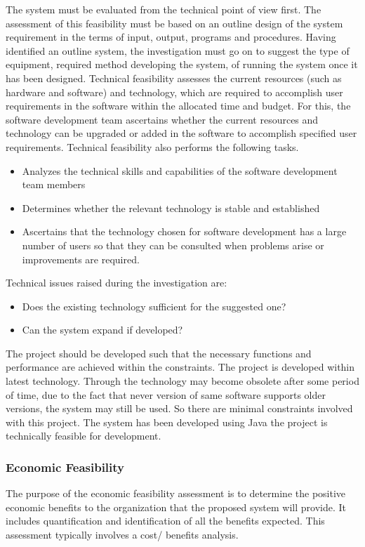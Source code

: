 The system must be evaluated from the technical point of view first. The assessment of this feasibility must be based on an outline design of the system requirement in the terms of input, output, programs and procedures. Having identified an outline system, the investigation must go on to suggest the type of equipment, required method developing the system, of running the system once it has been designed. Technical feasibility assesses the current resources (such as hardware and software) and technology, which are required to accomplish user requirements in the software within the allocated time and budget. For this, the software development team ascertains whether the current resources and technology can be upgraded or added in the software to accomplish specified user requirements. Technical feasibility also performs the following tasks.

\begin{itemize}
	\item Analyzes the technical skills and capabilities of the software development team members
	\item Determines whether the relevant technology is stable and established
	\item Ascertains that the technology chosen for software development has a large number of users so that they can be consulted when problems arise or improvements are required.
\end{itemize}

Technical issues raised during the investigation are:
\begin{itemize}
	\item Does the existing technology sufficient for the suggested one?
	\item Can the system expand if developed?
\end{itemize}

The project should be developed such that the necessary functions and performance are achieved within the constraints. The project is developed within latest technology. Through the technology may become obsolete after some period of time, due to the fact that never version of same software supports older versions, the system may still be used. So there are minimal constraints involved with this project. The system has been developed using Java the project is technically feasible for development.

\subsubsection{Economic Feasibility}
The purpose of the economic feasibility assessment is to determine the positive economic benefits to the organization that the proposed system will provide. It includes quantification and identification of all the benefits expected. This assessment typically involves a cost/ benefits analysis.

